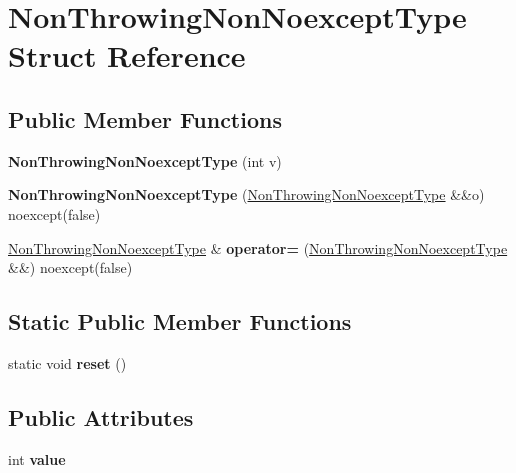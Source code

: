 \hypertarget{struct_non_throwing_non_noexcept_type}{}\section{Non\+Throwing\+Non\+Noexcept\+Type Struct Reference}
\label{struct_non_throwing_non_noexcept_type}
\subsection*{Public Member Functions}
\begin{DoxyCompactItemize}
\item 
\mbox{\label{struct_non_throwing_non_noexcept_type_a3377ac90b75d95180bc29d3d11d91745}} 
{\bfseries Non\+Throwing\+Non\+Noexcept\+Type} (int v)
\item 
\mbox{\label{struct_non_throwing_non_noexcept_type_a6d18a1488d1029b2acd88e19e8742c97}} 
{\bfseries Non\+Throwing\+Non\+Noexcept\+Type} (\mbox{\hyperlink{struct_non_throwing_non_noexcept_type}{Non\+Throwing\+Non\+Noexcept\+Type}} \&\&o) noexcept(false)
\item 
\mbox{\label{struct_non_throwing_non_noexcept_type_a3acc04245fa58121a67a49f4bf8aaa08}} 
\mbox{\hyperlink{struct_non_throwing_non_noexcept_type}{Non\+Throwing\+Non\+Noexcept\+Type}} \& {\bfseries operator=} (\mbox{\hyperlink{struct_non_throwing_non_noexcept_type}{Non\+Throwing\+Non\+Noexcept\+Type}} \&\&) noexcept(false)
\end{DoxyCompactItemize}
\subsection*{Static Public Member Functions}
\begin{DoxyCompactItemize}
\item 
\mbox{\label{struct_non_throwing_non_noexcept_type_a1f0a7dbeae79f16a20f568004f5b1930}} 
static void {\bfseries reset} ()
\end{DoxyCompactItemize}
\subsection*{Public Attributes}
\begin{DoxyCompactItemize}
\item 
\mbox{\label{struct_non_throwing_non_noexcept_type_a028a664402816b3792e8c691901b4738}} 
int {\bfseries value}
\end{DoxyCompactItemize}
